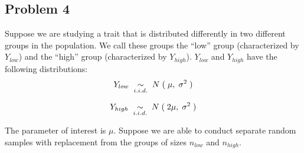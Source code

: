\documentclass[10pt]{article}
\begin{document}
\begin{itemize}

 \end{itemize}


\subsection*{Problem 4}


Suppose we are studying a trait that is distributed differently in two different groups in the population. We call these groups the ``low'' group (characterized by $Y_{low}$) and the ``high'' group (characterized by $Y_{high}$). $Y_{low}$ and $Y_{high}$ have the following distributions:\\

$$Y_{low} \hspace{0.1cm} \underset{i.i.d.}{\sim} \hspace{0.1cm} N\hspace{0.1cm}(\hspace{0.1cm}\mu,\hspace{0.1cm} \sigma^2\hspace{0.1cm}) $$

$$Y_{high} \hspace{0.1cm} \underset{i.i.d.}{\sim} \hspace{0.1cm} N\hspace{0.1cm}(\hspace{0.1cm}2 \mu,\hspace{0.1cm} \sigma^2\hspace{0.1cm}) $$

\noindent The parameter of interest is $\mu$. Suppose we are able to conduct separate random samples with replacement from the groups of sizes $n_{low}$ and $n_{high}$. \\%


\end{document}
